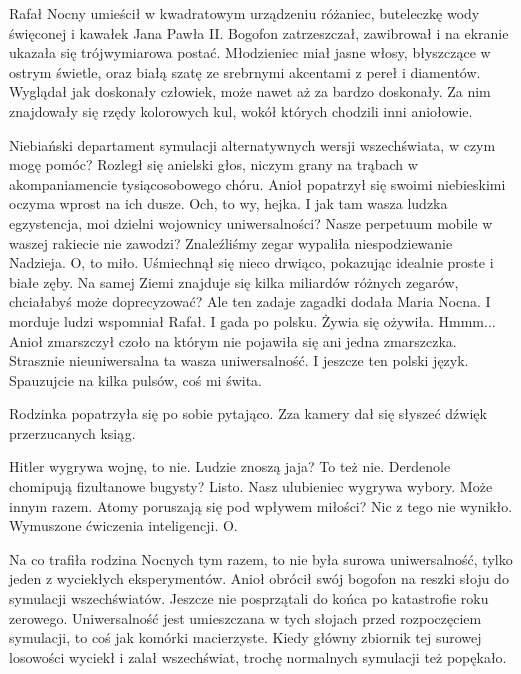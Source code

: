 Rafał Nocny umieścił w kwadratowym urządzeniu różaniec, buteleczkę wody święconej i kawałek Jana Pawła II.
Bogofon zatrzeszczał, zawibrował i na ekranie ukazała się trójwymiarowa postać.
Młodzieniec miał jasne włosy, błyszczące w ostrym świetle, oraz białą szatę ze srebrnymi akcentami z pereł i diamentów.
Wyglądał jak doskonały człowiek, może nawet aż za bardzo doskonały.
Za nim znajdowały się rzędy kolorowych kul, wokół których chodzili inni aniołowie.
\begin{dialogue}
	\ds{} Niebiański departament symulacji alternatywnych wersji wszechświata, w czym mogę pomóc? 
		\dm{} Rozległ się anielski głos, niczym grany na trąbach w akompaniamencie tysiącosobowego chóru. Anioł popatrzył się swoimi niebieskimi oczyma wprost na ich dusze.
		\dm{} Och, to wy, hejka. I jak tam wasza ludzka egzystencja, moi dzielni wojownicy uniwersalności? Nasze perpetuum mobile w waszej rakiecie nie zawodzi?
	\ds{} Znaleźliśmy zegar 
		\dm{} wypaliła niespodziewanie Nadzieja.
	\ds{} O, to miło. 
		\dm{} Uśmiechnął się nieco drwiąco, pokazując idealnie proste i białe zęby. 
		\dm{} Na samej Ziemi znajduje się kilka miliardów różnych zegarów, chciałabyś może doprecyzować?
	\ds{} Ale ten zadaje zagadki 
		\dm{} dodała Maria Nocna.
	\ds{} I morduje ludzi 
		\dm{} wspomniał Rafał.
	\ds{} I gada po polsku. 
		\dm{} Żywia się ożywiła.
	\ds{} Hmmm... 
		\dm{} Anioł zmarszczył czoło na którym nie pojawiła się ani jedna zmarszczka.
		\dm{} Strasznie nieuniwersalna ta wasza uniwersalność. I jeszcze ten polski język. Spauzujcie na kilka pulsów, coś mi świta.
\end{dialogue}
Rodzinka popatrzyła się po sobie pytająco. Zza kamery dał się słyszeć dźwięk przerzucanych ksiąg.
\begin{dialogue}
	\ds{} Hitler wygrywa wojnę, to nie.
	\ds{} Ludzie znoszą jaja? To też nie.
	\ds{} Derdenole chomipują fizultanowe bugysty? Listo.
	\ds{} Nasz ulubieniec wygrywa wybory. Może innym razem.
	\ds{} Atomy poruszają się pod wpływem miłości? Nic z tego nie wynikło.
	\ds{} Wymuszone ćwiczenia inteligencji. O.
\end{dialogue}
Na co trafiła rodzina Nocnych tym razem, to nie była surowa uniwersalność, tylko jeden z wyciekłych eksperymentów.
Anioł obrócił swój bogofon na reszki słoju do symulacji wszechświatów.
Jeszcze nie posprzątali do końca po katastrofie roku zerowego.
Uniwersalność jest umieszczana w tych słojach przed rozpoczęciem symulacji, to coś jak komórki macierzyste.
Kiedy główny zbiornik tej surowej losowości wyciekł i zalał wszechświat, trochę normalnych symulacji też popękało.
